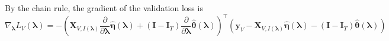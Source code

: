 \documentclass[10pt,letterpaper]{article}
\begin{document}
%

By the chain rule, the gradient of the validation loss is
\begin{equation*}
\nabla_{\boldsymbol{\lambda}} L_V(\boldsymbol{\lambda}) =
- \left(
\boldsymbol{X}_{V, I(\boldsymbol\lambda)} \frac{\partial}{\partial \boldsymbol{\lambda}} \hat{\boldsymbol\eta}(\boldsymbol{\lambda})
+ (\boldsymbol I - \boldsymbol{I}_T) \frac{\partial}{\partial \boldsymbol{\lambda}} \hat{\boldsymbol\theta}(\boldsymbol{\lambda})
\right )^\top
\left (
\boldsymbol{y}_V
- \boldsymbol{X}_{V, I(\boldsymbol\lambda)} \hat{\boldsymbol\eta}(\boldsymbol{\lambda})
- (\boldsymbol I - \boldsymbol{I}_T) \hat{\boldsymbol\theta}(\boldsymbol{\lambda})
\right )
\end{equation*}
\end{document}
